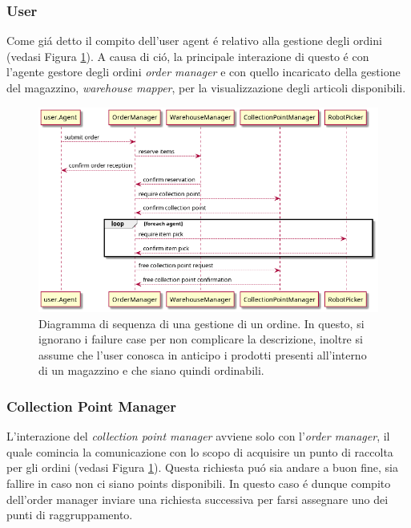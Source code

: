 \subsubsection{User}
Come gi\'a detto il compito dell'user agent \'e relativo alla gestione degli ordini (vedasi Figura \ref{fig:order_management-sequence_diagram}). A causa di ci\'o, la principale interazione di questo \'e con l'agente gestore degli ordini \textit{order manager} e con quello incaricato della gestione del magazzino, \textit{warehouse mapper}, per la visualizzazione degli articoli disponibili.
\begin{figure}[!ht]\centering
    \includegraphics[width=\textwidth]{section/design/figure/order_management-sequence_diagram.png}
    \caption{Diagramma di sequenza di una gestione di un ordine. In questo, si ignorano i failure case per non complicare la descrizione, inoltre si assume che l'user conosca in anticipo i prodotti presenti all'interno di un magazzino e che siano quindi ordinabili.}
    \label{fig:order_management-sequence_diagram}
\end{figure}

\subsubsection{Collection Point Manager}
L'interazione del \textit{collection point manager} avviene solo con l'\textit{order manager}, il quale comincia la comunicazione con lo scopo di acquisire un punto di raccolta per gli ordini (vedasi Figura \ref{fig:order_management-sequence_diagram}). Questa richiesta pu\'o sia andare a buon fine, sia fallire in caso non ci siano points disponibili. In questo caso \'e dunque compito dell'order manager inviare una richiesta successiva per farsi assegnare uno dei punti di raggruppamento.

